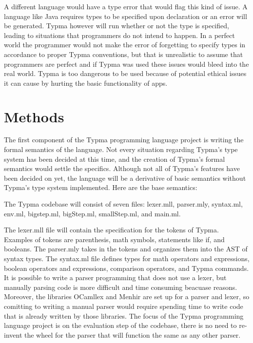 \documentclass[10pt,twocolumn]{article}
\begin{document}
A different language would have a type error that would flag this kind of issue. A language like Java requires types to be specified upon declaration or an error will be generated. Typma however will run whether or not the type is specified, leading to situations that programmers do not intend to happen. In a perfect world the programmer would not make the error of forgetting to specify types in accordance to proper Typma conventions, but that is unrealistic to assume that programmers are perfect and if Typma was used these issues would bleed into the real world. Typma is too dangerous to be used because of potential ethical issues it can cause by hurting the basic functionality of apps.

\section{Methods}

The first component of the Typma programming language project is writing the formal semantics of the language. Not every situation regarding Typma's type system has been decided at this time, and the creation of Typma's formal semantics would settle the specifics. Although not all of Typma's features have been decided on yet, the language will be a derivative of basic semantics without Typma's type system implemented. Here are the base semantics:

The Typma codebase will consist of seven files: lexer.mll, parser.mly, syntax.ml, env.ml, bigstep.ml, bigStep.ml, smallStep.ml, and main.ml.

The lexer.mll file will contain the specification for the tokens of Typma. Examples of tokens are parenthesis, math symbols, statements like if, and booleans. The parser.mly takes in the tokens and organizes them into the AST of syntax types. The syntax.ml file defines types for math operators and expressions, boolean operators and expressions, comparison operators, and Typma commands. It is possible to write a parser programming that does not use a lexer, but manually parsing code is more difficult and time consuming beacuase reasons. Moreover, the libraries OCamllex and Menhir are set up for a parser and lexer, so comitting to writing a manual parser would require spending time to write code that is already written by those libraries. The focus of the Typma programming language project is on the evaluation step of the codebase, there is no need to re-invent the wheel for the parser that will function the same as any other parser.
\end{document}
